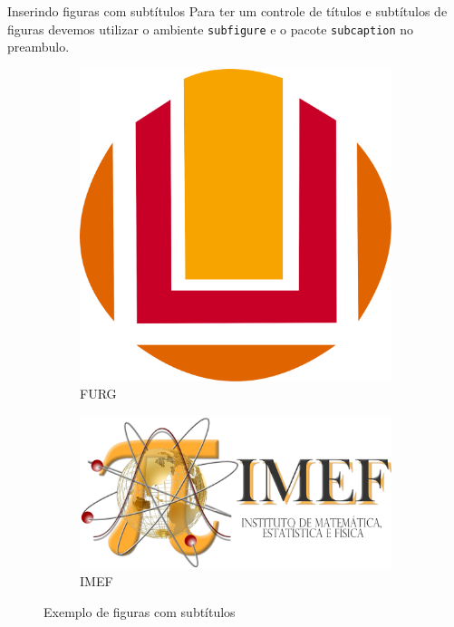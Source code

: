 \documentclass[c]{beamer}
\begin{document}
{\begin{frame}[fragile]{\sc Inserindo figuras com subtítulos}
			Para ter um controle de {\color{blue} títulos e subtítulos de figuras} devemos utilizar o ambiente {\color{blue}\verb|subfigure|} e o pacote \verb|subcaption| no preambulo.
\begin{figure}[h]
				\centering
\begin{subfigure}{0.5\textwidth}
					\centering
					\includegraphics[scale=0.1]{images/furg.png}
					\caption{FURG}
\end{subfigure}%
\begin{subfigure}{0.5\textwidth}
					\centering
					\includegraphics[scale=0.1]{images/imef2.png}
					\caption{IMEF}
\end{subfigure}
				\caption{Exemplo de figuras com subtítulos}
\end{figure}
			

\end{frame}}
\end{document}
